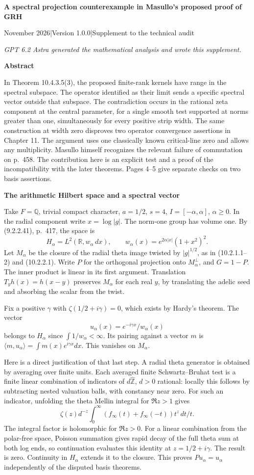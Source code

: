\documentclass[11pt]{article}
\newcommand{\R}{\mathbb R}\newcommand{\Q}{\mathbb Q}\newcommand{\C}{\mathbb C}
\newcommand{\Z}{\mathbb Z}\newcommand{\A}{\mathbb A}
\newcommand{\topic}[1]{\par\medskip\textbf{#1}\par}
\begin{document}
{\LARGE\bfseries\color{ink}A spectral projection counterexample in Masullo's proposed proof of GRH}\par
{\small{} November 2026\quad|\quad Version 1.0.0\quad|\quad Supplement to the technical audit}
{\small\itshape GPT 6.2 Astra generated the mathematical analysis and wrote this supplement.\par}
\topic{Abstract}
In Theorem 10.4.3.5(3), the proposed finite-rank kernels have range in the spectral subspace. The operator identified as their limit sends a specific spectral vector outside that subspace. The contradiction occurs in the rational zeta component at the central parameter, for a single smooth test supported at norms greater than one, simultaneously for every positive strip width. The same construction at width zero disproves two operator convergence assertions in Chapter 11. The argument uses one classically known critical-line zero and allows any multiplicity. Masullo himself recognizes the relevant failure of commutation on p.~458. The contribution here is an explicit test and a proof of the incompatibility with the later theorems. Pages 4--5 give separate checks on two basis assertions.
\topic{The arithmetic Hilbert space and a spectral vector}
Take \(F=\Q\), trivial compact character, \(a=1/2\), \(s=4\), \(I=[-\alpha,\alpha]\), \(\alpha\ge0\). In the radial component write \(x=\log|g|\). The norm-one group has volume one. By (9.2.2.41), p.~417, the space is
\[
 H_\alpha=L^2(\R,w_\alpha\,dx),\qquad w_\alpha(x)=e^{2\alpha|x|}(1+x^2)^2.
\]
Let \(M_\alpha\) be the closure of the radial theta image twisted by \(|g|^{1/2}\), as in (10.2.1.1--2) and (10.2.2.1). Write \(P\) for the orthogonal projection onto \(M_\alpha^\perp\), and \(G=1-P\). The inner product is linear in its first argument. Translation \(T_y h(x)=h(x-y)\) preserves \(M_\alpha\) for each real \(y\), by translating the adelic seed and absorbing the scalar from the twist.
 
Fix a positive \(\gamma\) with \(\zeta(1/2+i\gamma)=0\), which exists by Hardy's theorem. The vector
\[
                 u_\alpha(x)=e^{-i\gamma x}/w_\alpha(x)
\]
belongs to \(H_\alpha\) since \(\int 1/w_\alpha<\infty\). Its pairing against a vector \(m\) is \(\langle m,u_\alpha\rangle=\int m(x)e^{i\gamma x}dx\). This vanishes on \(M_\alpha\).

Here is a direct justification of that last step. A radial theta generator is obtained by averaging over finite units. Each averaged finite Schwartz--Bruhat test is a finite linear combination of indicators of \(d\widehat{\Z}\), \(d>0\) rational: locally this follows by subtracting nested valuation balls, with constancy near zero. For such an indicator, unfolding the theta Mellin integral for \(\Re z>1\) gives
\[
       \zeta(z)d^{-z}\int_0^\infty(f_\infty(t)+f_\infty(-t))t^z\,dt/t .
\]
The integral factor is holomorphic for \(\Re z>0\). For a linear combination from the polar-free space, Poisson summation gives rapid decay of the full theta sum at both log ends, so continuation evaluates this identity at \(z=1/2+i\gamma\). The result is zero. Continuity in \(H_\alpha\) extends it to the closure. This proves \(Pu_\alpha=u_\alpha\) independently of the disputed basis theorems.
\end{document}
